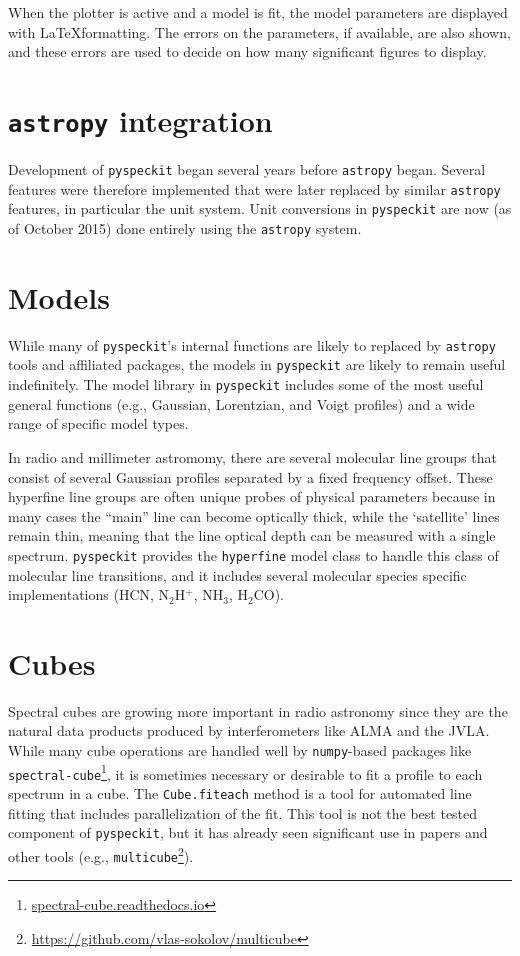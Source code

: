 \documentclass[twocolumn]{aastex61}
\newcommand{\pyspeckit}{\texttt{pyspeckit}\xspace}
\newcommand{\astropy}{\texttt{astropy}\xspace}
\begin{document}
When the plotter is active and a model is fit, the model parameters are
displayed with \LaTeX formatting.  The errors on the parameters, if available,
are also shown, and these errors are used to decide on how many significant
figures to display.

\section{\astropy integration}
Development of \pyspeckit began several years before \astropy began.  Several
features were therefore implemented that were later replaced by similar
\astropy features, in particular the unit system.  Unit conversions in
\pyspeckit are now (as of October 2015) done entirely using the \astropy
system.

\section{Models}
While many of \pyspeckit's internal functions are likely to replaced by
\astropy tools and affiliated packages, the models in \pyspeckit are likely to
remain useful indefinitely.  The model library in \pyspeckit includes some of
the most useful general functions (e.g., Gaussian, Lorentzian, and Voigt
profiles) and a wide range of specific model types.

In radio and millimeter astromomy, there are several molecular line groups that
consist of several Gaussian profiles separated by a fixed frequency offset.
These hyperfine line groups are often unique probes of physical parameters
because in many cases the ``main'' line can become optically thick, while the
`satellite' lines remain thin, meaning that the line optical depth can be
measured with a single spectrum.  \pyspeckit provides the \texttt{hyperfine}
model class to handle this class of molecular line transitions, and it includes
several molecular species specific implementations (HCN, N$_2$H$^+$, NH$_3$,
H$_2$CO).

\section{Cubes}
Spectral cubes are growing more important in radio astronomy since they are the
natural data products produced by interferometers like ALMA and the JVLA.
While many cube operations are handled well by \texttt{numpy}-based packages
like \texttt{spectral-cube}\footnote{\url{spectral-cube.readthedocs.io}},
it is sometimes necessary or desirable to fit a profile to each spectrum
in a cube.  The \texttt{Cube.fiteach} method is a tool for automated line
fitting that includes parallelization of the fit.  This tool is not the best
tested component of \pyspeckit, but it has already seen significant use in
papers and other tools (e.g.,
\texttt{multicube}\footnote{\url{https://github.com/vlas-sokolov/multicube}}).


\end{document}
